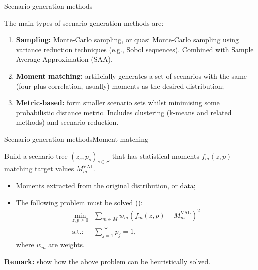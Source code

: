 \begin{frame}{Scenario generation methods}

	The main types of scenario-generation methods are:
	\begin{enumerate}[<+->]
		\item {\bf Sampling:} Monte-Carlo sampling, or quasi Monte-Carlo sampling using variance reduction techniques (e.g., Sobol sequences). Combined with Sample Average Approximation (SAA). 
		\item {\bf Moment matching:} artificially generates a set of scenarios with the same (four plus correlation, usually) moments as the desired distribution;
		\item {\bf Metric-based:} form smaller scenario sets whilst minimising some probabilistic distance metric. Includes clustering (k-means and related methods) and scenario reduction. %
	\end{enumerate}

	
\end{frame}

\begin{frame}{Scenario generation methods}{Moment matching}

	Build a scenario tree $(z_s,p_s)_{s \in \Xi}$ that has statistical moments $f_m(z,p)$ matching target values $M^{\text{VAL}}_m$.
	\begin{itemize}
		\item Moments extracted from the original distribution, or data;
		\item The following problem must be solved ({\small \cite{hoyland2001generating}}):
		\begin{equation*}
			\begin{aligned}
				\min_{z, p \ge 0} & \sum_{m \in M} w_m(f_m(z,p) - M^{\text{VAL}}_m)^2 \\
				\text{s.t.:~} & \sum_{j=1}^{|\Xi|} p_j = 1,	
			\end{aligned}
		\end{equation*}
		where $w_m$ are weights.
	\end{itemize}
	
	{\bf Remark:} \alert{\small \cite{hoyland2003heuristic}} show how the above problem can be heuristically solved.
\end{frame}


